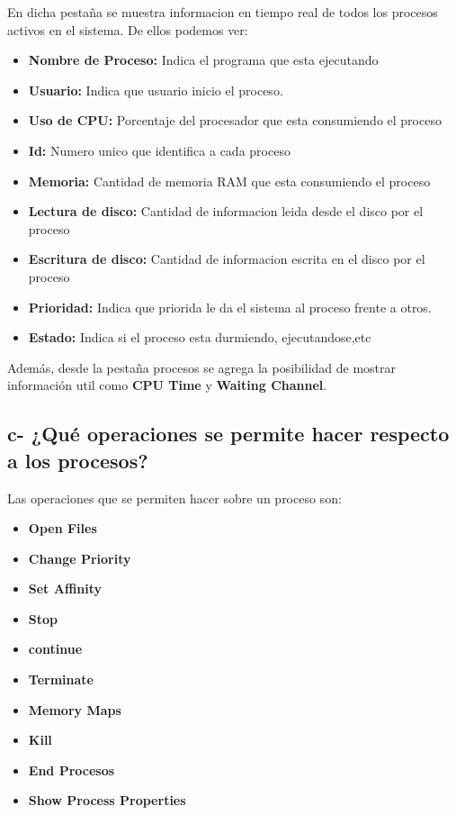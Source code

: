 \documentclass{article}
\begin{document}
\noindent
En dicha pestaña se muestra informacion en tiempo real de todos los procesos activos en el sistema. De ellos podemos ver:
\begin{itemize}
  \item \textbf{Nombre de Proceso: }Indica el programa que esta ejecutando
  \item \textbf{Usuario:} Indica que usuario inicio el proceso.
  \item \textbf{Uso de CPU:} Porcentaje del procesador que esta consumiendo el proceso
  \item \textbf{Id:} Numero unico que identifica a cada proceso
  \item \textbf{Memoria:} Cantidad de memoria RAM que esta consumiendo el proceso
  \item \textbf{Lectura de disco:} Cantidad de informacion leida desde el disco por el proceso
  \item \textbf{Escritura de disco:} Cantidad de informacion escrita en el disco por el proceso
  \item \textbf{Prioridad:} Indica que priorida le da el sistema al proceso frente a otros.
  \item \textbf{Estado:} Indica si el proceso esta durmiendo, ejecutandose,etc
\end{itemize}

\noindent
Además, desde la pestaña procesos se agrega la posibilidad de mostrar información util como \textbf{CPU Time} y \textbf{Waiting Channel}.
\subsection*{c- ¿Qué operaciones se permite hacer respecto a los procesos?}

\noindent
Las operaciones que se permiten hacer sobre un proceso son:
\begin{itemize}
  \item \textbf{Open Files}
  \item \textbf{Change Priority}
  \item \textbf{Set Affinity}
  \item \textbf{Stop}
  \item \textbf{continue}
  \item \textbf{Terminate}
  \item \textbf{Memory Maps}
  \item \textbf{Kill}
  \item \textbf{End Procesos}
  \item \textbf{Show Process Properties}
\end{itemize}
\end{document}

